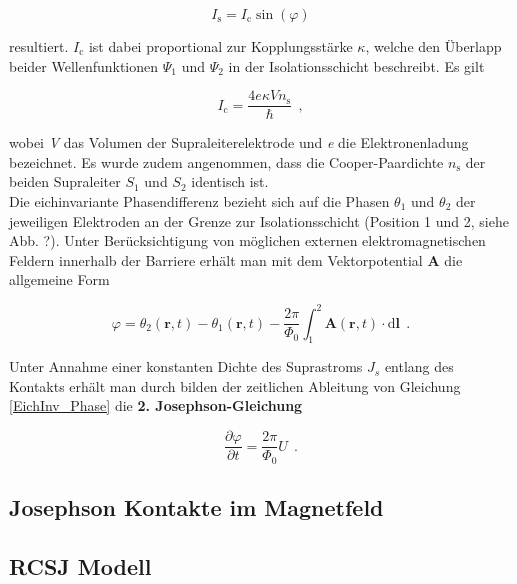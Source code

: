  

\begin{equation}
I_\mathrm{s} = I_\mathrm{c}\sin(\varphi)
\end{equation}

resultiert. $I_\mathrm{c}$ ist dabei proportional zur Kopplungsstärke $\kappa$, welche den Überlapp beider Wellenfunktionen $\Psi_1$ und $\Psi_2$ in der Isolationsschicht beschreibt. Es gilt

\begin{equation}
I_\mathrm{c} = \frac{4e\kappa V n_\mathrm{s}}{\hbar} \ \ ,
\end{equation}

wobei \textit{V} das Volumen der Supraleiterelektrode und \textit{e} die Elektronenladung bezeichnet. Es wurde zudem angenommen, dass die Cooper-Paardichte $n_\mathrm{s}$ der beiden Supraleiter $S_1$ und $S_2$ identisch ist. \\
Die eichinvariante Phasendifferenz bezieht sich auf die Phasen $\theta_1$ und $\theta_2$ der jeweiligen Elektroden an der Grenze zur Isolationsschicht (Position 1 und 2, siehe Abb. ?). Unter Berücksichtigung von möglichen externen elektromagnetischen Feldern innerhalb der Barriere erhält man mit dem Vektorpotential \textbf{A} die allgemeine Form

\begin{equation}
\label{EichInv_Phase}
\varphi = \theta_2(\textbf{r},t) - \theta_1(\textbf{r},t) - \frac{2\pi}{\Phi_0}\int_{1}^{2}\textbf{A}(\textbf{r},t)\cdot \mathrm{d}\textbf{l} \ \ .
\end{equation}

Unter Annahme einer konstanten Dichte des Suprastroms $J_s$ entlang des Kontakts erhält man durch bilden der zeitlichen Ableitung von Gleichung \eqref{EichInv_Phase} die \textbf{2. Josephson-Gleichung}

\begin{equation}
\frac{\partial\varphi}{\partial t} = \frac{2\pi}{\Phi_0}U \ \ .
\end{equation}


\subsection{Josephson Kontakte im Magnetfeld}

\Blindtext

\subsection{RCSJ Modell}

